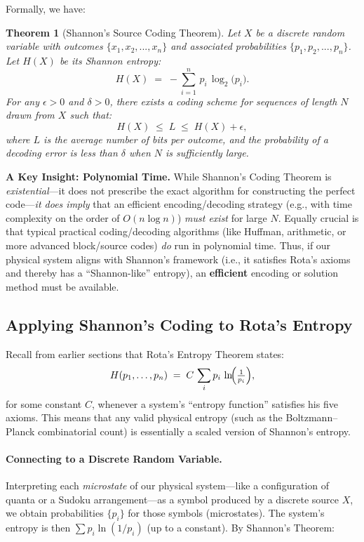 \documentclass{report}
\newtheorem{theorem}{Theorem}
\begin{document}
Formally, we have:

\begin{theorem}[Shannon's Source Coding Theorem]
\label{thm:ShannonSource}
Let \(X\) be a discrete random variable with outcomes \(\{x_1, x_2, ..., x_n\}\) and associated probabilities \(\{p_1, p_2, ..., p_n\}\). Let \(H(X)\) be its Shannon entropy:
\[
  H(X) \;=\; -\sum_{i=1}^{n}\,p_i \,\log_2\bigl(p_i\bigr).
\]
For any \(\epsilon>0\) and \(\delta>0\), there exists a coding scheme for sequences of length \(N\) drawn from \(X\) such that:
\[
  H(X) \;\leq\; L \;\leq\; H(X) + \epsilon,
\]
where \(L\) is the average number of bits per outcome, and the probability of a decoding error is less than \(\delta\) when \(N\) is sufficiently large.
\end{theorem}

\noindent
\textbf{A Key Insight: Polynomial Time.}  
While Shannon's Coding Theorem is \emph{existential}—it does not prescribe the exact algorithm for constructing the perfect code—\emph{it does imply} that an efficient encoding/decoding strategy (e.g., with time complexity on the order of \(O(n \log n)\)) \textit{must exist} for large \(N\). Equally crucial is that typical practical coding/decoding algorithms (like Huffman, arithmetic, or more advanced block/source codes) \emph{do} run in polynomial time. Thus, if our physical system aligns with Shannon's framework (i.e., it satisfies Rota's axioms and thereby has a ``Shannon-like'' entropy), an \textbf{efficient} encoding or solution method must be available.

\subsection*{Applying Shannon's Coding to Rota's Entropy}

Recall from earlier sections that Rota’s Entropy Theorem states:  
\[
  H(p_1,\dots,p_n) \;=\; C \,\sum_i p_i\,\ln \!\Bigl(\tfrac{1}{p_i}\Bigr),
\]
for some constant \(C\), whenever a system's “entropy function” satisfies his five axioms. This means that any valid physical entropy (such as the Boltzmann--Planck combinatorial count) is essentially a scaled version of Shannon’s entropy.

\paragraph{Connecting to a Discrete Random Variable.}  
Interpreting each \emph{microstate} of our physical system—like a configuration of quanta or a Sudoku arrangement—as a symbol produced by a discrete source \(X\), we obtain probabilities \(\{p_i\}\) for those symbols (microstates). The system’s entropy is then \(\sum p_i\ln(1/p_i)\) (up to a constant). By Shannon's Theorem:
\end{document}
